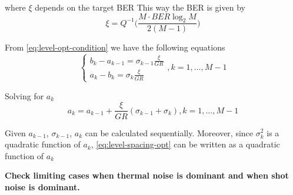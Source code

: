 \documentclass[a4paper]{article}
\begin{document}
where $\xi$ depends on the target BER 
This way the BER is given by
\begin{equation}
\xi = Q^{-1}\bigg(\frac{M\cdot BER\log_2 M}{2(M-1)}\bigg)
\end{equation}

From \eqref{eq:level-opt-condition} we have the following equations
\begin{equation}
\begin{cases}
b_k - a_{k-1} = \sigma_{k-1}\frac{\xi}{GR} \\
a_k - b_k = \sigma_{k}\frac{\xi}{GR}
\end{cases}, k = 1, \ldots, M-1
\end{equation}

Solving for $a_k$
\begin{equation} \label{eq:level-spacing-opt}
a_k = a_{k-1} + \frac{\xi}{GR}(\sigma_{k-1} + \sigma_k), k = 1, \ldots, M-1
\end{equation}

Given $a_{k-1}$, $\sigma_{k-1}$, $a_k$ can be calculated sequentially. Moreover, since $\sigma_k^2$ is a quadratic function of $a_k$, \eqref{eq:level-spacing-opt} can be written as a quadratic function of $a_k$

\textbf{Check limiting cases when thermal noise is dominant and when shot noise is dominant.}


\end{document}
